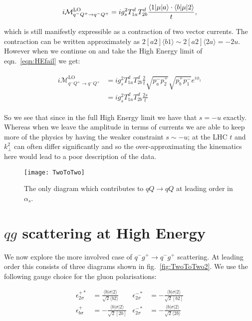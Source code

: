 	\begin{equation}
		i\mathcal{M}_{q^-Q^+\rightarrow q^-Q^+}^{\text{LO}} = ig_s^2T^d_{1a}T^d_{2b}
		\frac{\langle 1 | \mu | a \rangle\cdot\langle b | \mu | 2 \rangle}{t},
		\label{eqn:HEfail}
	\end{equation}

	which is still manifestly expressible as a contraction of two vector currents.  The contraction
	can be written approximately as $2[a2]\langle b1\rangle\sim2[a2]\langle2a\rangle=-2u$.
	However when we continue on and take the High Energy limit of eqn.~\eqref{eqn:HEfail} we get:

	\begin{align}
	\begin{split}
		i\mathcal{M}_{q^-Q^+\rightarrow q^-Q^+}^{\text{LO}} &=
		ig_s^2T^d_{1a}T^d_{2b}\frac{2}{t}\sqrt{p_a^-p_2^+}\sqrt{p_b^+p_1^-}e^{i\phi_1}\\
		&=ig_s^2T^d_{1a}T^d_{2b}\frac{2s}{t}
		\label{eqn:HEfail2}
	\end{split}
	\end{align}

	So we see that since in the full High Energy limit we have that $s=-u$
	exactly.  Whereas when we leave the amplitude in terms of currents we are able to keep
	more of the physics by having the weaker constraint $s\sim-u$; at the LHC $t$ and $k_\perp^2$
	can often differ significantly and so the over-approximating the kinematics here would
	lead to a poor description of the data.

	\begin{figure}
		\begin{center}
		\texttt{[image: TwoToTwo]}
		\caption{The only diagram which contributes to $qQ\rightarrow qQ$ at leading order in $\alpha_s$.}
		\label{fig:TwoToTwo}
		\end{center}
	\end{figure}

\section{$qg$ scattering at High Energy}
	\label{sec:qg}

	We now explore the more involved case of $q^-g^+\to q^-g^+$ scattering.  At leading order this
	consists of three diagrams shown in fig.~\eqref{fig:TwoToTwo2}.  We use the following gauge
	choice for the gluon polarisations:

	\begin{align}
	\epsilon^{+*}_{2\sigma}&=\frac{\langle b|\sigma|2\rangle}{\sqrt{2}\langle b2\rangle}
	& \epsilon^{-*}_{2\sigma} &= -\frac{\langle b|\sigma|2\rangle}{\sqrt{2}[b2]} \\
	\epsilon^{+}_{b\sigma}&=-\frac{\langle b|\sigma|2\rangle}{\sqrt{2}[2b]}
	& \epsilon^{-*}_{2\sigma} &= -\frac{\langle b|\sigma|2\rangle}{\sqrt{2}\langle 2b\rangle}
	\end{align}

